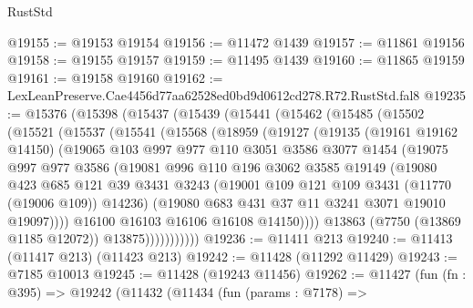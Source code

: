 \begin{lexlean}{RustStd}
\begin{coremodule}
@19155 := @19153 @19154
@19156 := @11472 @1439
@19157 := @11861 @19156
@19158 := @19155 @19157
@19159 := @11495 @1439
@19160 := @11865 @19159
@19161 := @19158 @19160
@19162 := LexLeanPreserve.Cae4456d77aa62528ed0bd9d0612cd278.R72.RustStd.fal8
@19235 := @15376
    (@15398
      (@15437
        (@15439
          (@15441
            (@15462
              (@15485
                (@15502
                  (@15521
                    (@15537
                      (@15541
                        (@15568
                          (@18959
                            (@19127
                              (@19135
                                (@19161 @19162 @14150)
                                (@19065
                                  @103
                                  @997
                                  @977
                                  @110
                                  @3051
                                  @3586
                                  @3077
                                  @1454
                                  (@19075
                                    @997
                                    @977
                                    @3586
                                    (@19081
                                      @996
                                      @110
                                      @196
                                      @3062
                                      @3585
                                      @19149
                                      (@19080
                                        @423
                                        @685
                                        @121
                                        @39
                                        @3431
                                        @3243
                                        (@19001 @109 @121 @109 @3431 (@11770 (@19006 @109)) @14236)
                                        (@19080 @683 @431 @37 @11 @3241 @3071 @19010 @19097))))
                                  @16100
                                  @16103
                                  @16106
                                  @16108
                                  @14150))))
                          @13863
                          (@7750 (@13869 @1185 @12072))
                          @13875)))))))))))
@19236 := @11411 @213
@19240 := @11413 (@11417 @213) (@11423 @213)
@19242 := @11428 (@11292 @11429)
@19243 := @7185 @10013
@19245 := @11428 (@19243 @11456)
@19262 := @11427
    (fun (fn : @395) =>
    @19242
      (@11432
        (@11434
          (fun (params : @7178) =>

\end{coremodule}
\end{lexlean}

